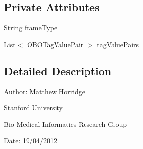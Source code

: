 \subsection*{Private Attributes}
\begin{DoxyCompactItemize}
\item 
String \hyperlink{classorg_1_1coode_1_1owlapi_1_1obo_1_1parser_1_1_o_b_o_frame_a9ec84cff2d3442a83d8f58d842073d3a}{frame\-Type}
\item 
List$<$ \hyperlink{classorg_1_1coode_1_1owlapi_1_1obo_1_1parser_1_1_o_b_o_tag_value_pair}{O\-B\-O\-Tag\-Value\-Pair} $>$ \hyperlink{classorg_1_1coode_1_1owlapi_1_1obo_1_1parser_1_1_o_b_o_frame_a3c5893e579b39afc4227b9d6b15cbcff}{tag\-Value\-Pairs}
\end{DoxyCompactItemize}


\subsection{Detailed Description}
Author\-: Matthew Horridge\par
 Stanford University\par
 Bio-\/\-Medical Informatics Research Group\par
 Date\-: 19/04/2012 

